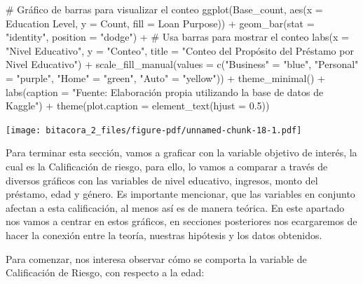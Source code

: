 \documentclass[
  letterpaper,
  DIV=11,
  numbers=noendperiod]{scrreprt}
\newenvironment{Shaded}{\begin{snugshade}}{\end{snugshade}}
\newcommand{\AttributeTok}[1]{\textcolor[rgb]{0.40,0.45,0.13}{#1}}
\newcommand{\CommentTok}[1]{\textcolor[rgb]{0.37,0.37,0.37}{#1}}
\newcommand{\FloatTok}[1]{\textcolor[rgb]{0.68,0.00,0.00}{#1}}
\newcommand{\FunctionTok}[1]{\textcolor[rgb]{0.28,0.35,0.67}{#1}}
\newcommand{\NormalTok}[1]{\textcolor[rgb]{0.00,0.23,0.31}{#1}}
\newcommand{\OtherTok}[1]{\textcolor[rgb]{0.00,0.23,0.31}{#1}}
\newcommand{\SpecialCharTok}[1]{\textcolor[rgb]{0.37,0.37,0.37}{#1}}
\newcommand{\StringTok}[1]{\textcolor[rgb]{0.13,0.47,0.30}{#1}}
\begin{document}
\begin{Shaded}
\begin{Highlighting}[]
\CommentTok{\# Gráfico de barras para visualizar el conteo}
\FunctionTok{ggplot}\NormalTok{(Base\_count, }\FunctionTok{aes}\NormalTok{(}\AttributeTok{x =} \StringTok{\textasciigrave{}}\AttributeTok{Education Level}\StringTok{\textasciigrave{}}\NormalTok{, }\AttributeTok{y =}\NormalTok{ Count, }\AttributeTok{fill =} \StringTok{\textasciigrave{}}\AttributeTok{Loan Purpose}\StringTok{\textasciigrave{}}\NormalTok{)) }\SpecialCharTok{+}
  \FunctionTok{geom\_bar}\NormalTok{(}\AttributeTok{stat =} \StringTok{"identity"}\NormalTok{, }\AttributeTok{position =} \StringTok{"dodge"}\NormalTok{) }\SpecialCharTok{+}  \CommentTok{\# Usa barras para mostrar el conteo}
  \FunctionTok{labs}\NormalTok{(}\AttributeTok{x =} \StringTok{"Nivel Educativo"}\NormalTok{, }\AttributeTok{y =} \StringTok{"Conteo"}\NormalTok{, }\AttributeTok{title =} \StringTok{"Conteo del Propósito del Préstamo por Nivel Educativo"}\NormalTok{) }\SpecialCharTok{+}
  \FunctionTok{scale\_fill\_manual}\NormalTok{(}\AttributeTok{values =} \FunctionTok{c}\NormalTok{(}\StringTok{"Business"} \OtherTok{=} \StringTok{"blue"}\NormalTok{, }\StringTok{"Personal"} \OtherTok{=} \StringTok{"purple"}\NormalTok{, }\StringTok{"Home"} \OtherTok{=} \StringTok{"green"}\NormalTok{, }\StringTok{"Auto"} \OtherTok{=} \StringTok{"yellow"}\NormalTok{)) }\SpecialCharTok{+}
  \FunctionTok{theme\_minimal}\NormalTok{() }\SpecialCharTok{+}
  \FunctionTok{labs}\NormalTok{(}\AttributeTok{caption =} \StringTok{"Fuente: Elaboración propia utilizando la base de datos de Kaggle"}\NormalTok{) }\SpecialCharTok{+}
\FunctionTok{theme}\NormalTok{(}\AttributeTok{plot.caption =} \FunctionTok{element\_text}\NormalTok{(}\AttributeTok{hjust =} \FloatTok{0.5}\NormalTok{)) }
\end{Highlighting}
\end{Shaded}

\texttt{[image: bitacora\_2\_files/figure-pdf/unnamed-chunk-18-1.pdf]}

Para terminar esta sección, vamos a graficar con la variable objetivo de
interés, la cual es la Calificación de riesgo, para ello, lo vamos a
comparar a través de diversos gráficos con las variables de nivel
educativo, ingresos, monto del préstamo, edad y género. Es importante
mencionar, que las variables en conjunto afectan a esta calificación, al
menos así es de manera teórica. En este apartado nos vamos a centrar en
estos gráficos, en secciones posteriores nos ecargaremos de hacer la
conexión entre la teoría, nuestras hipótesis y los datos obtenidos.

Para comenzar, nos interesa observar cómo se comporta la variable de
Calificación de Riesgo, con respecto a la edad:
\end{document}

